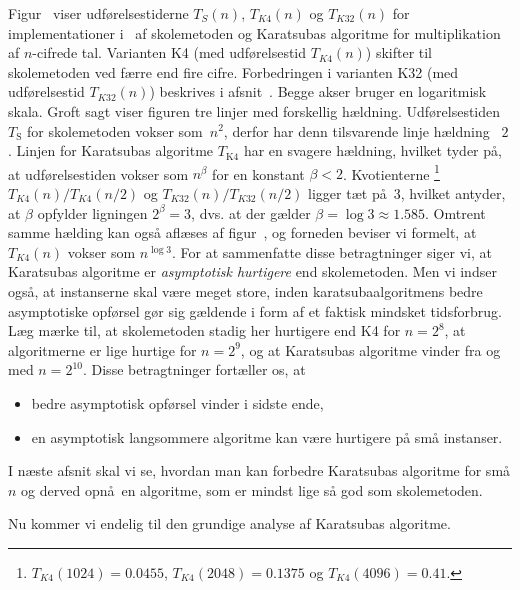 %
Figur~ viser udførelsestiderne 
$T_S(n)$, $T_{K4}(n)$ og  $T_{K32}(n)$ for implementationer i \CC\ af skolemetoden og Karatsubas algoritme for multiplikation af $n$-cifrede tal.
Varianten K4 (med udførelsestid $T_{K4}(n)$) skifter til skolemetoden ved færre end fire cifre.
Forbedringen i varianten K32 (med udførelsestid $T_{K32}(n)$) beskrives i
afsnit~.
Begge akser bruger en logaritmisk skala.
Groft sagt viser figuren tre linjer med forskellig hældning.
Udførelsestiden $T_\mathrm S$ for skolemetoden vokser som~$n^2$, derfor har denn tilsvarende linje hældning ~$2$.
Linjen for  Karatsubas algoritme $T_{\mathrm K4}$ har en svagere hældning, hvilket tyder på, at udførelsestiden vokser som $n^\beta$ for en konstant $\beta < 2$.
Kvotienterne \footnote{$T_{K4}(1024) = \num{0.0455}$,
$T_{K4}(2048) = \num{0.1375}$ og $T_{K4}(4096) = \num{0.41}$.} 
$T_{K4}(n)/T_{K4}(n/2)$ 
og $T_{K32}(n)/T_{K32}(n/2)$ ligger tæt på~$3$, hvilket antyder, at $\beta$  opfylder ligningen $2^\beta = 3$, dvs. at der gælder $\beta = \log 3 \approx \num{1.585}$.    
Omtrent samme hælding kan også aflæses af figur~, og forneden beviser vi formelt, at $T_{K4}(n)$ vokser som  
$n^{\log 3}$.
For at sammenfatte disse betragtninger siger vi, at Karatsubas algoritme er \emph{asymptotisk hurtigere} 
end skolemetoden.
Men vi indser også, at instanserne skal være meget store, inden karatsubaalgoritmens bedre asymptotiske opførsel gør sig gældende i form af et faktisk mindsket tidsforbrug.
Læg mærke til, at skolemetoden stadig her hurtigere end K4 for $n=2^8$, at algoritmerne er lige hurtige for $n=2^9$, og at Karatsubas algoritme vinder fra og med $n=2^{10}$.
Disse betragtninger fortæller os, at
\begin{itemize}
\item bedre asymptotisk opførsel vinder i sidste ende,
\item en asymptotisk langsommere algoritme kan være hurtigere på små instanser.
\end{itemize}
I næste afsnit skal vi se, hvordan man kan forbedre Karatsubas algoritme for små $n$ og derved opnå en algoritme, som er mindst lige så god som skolemetoden. 

Nu kommer vi  endelig til den grundige analyse af Karatsubas algoritme.

